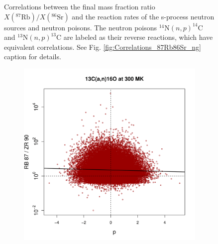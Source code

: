 \begin{figure}[!p]
\begin{subfigure}[b]{0.495\textwidth}
\end{subfigure}
\caption{\label{fig:Correlations_87Rb86Sr_n}Correlations between the final mass fraction ratio $X(^{87}\mathrm{Rb})/X(^{86}\mathrm{Sr})$ and the reaction rates of the s-process neutron sources and neutron poisons. The neutron poisons $^{14}\mathrm{N}(n,p)^{14}\mathrm{C}$ and $^{13}\mathrm{N}(n,p)^{13}\mathrm{C}$ are labeled as their reverse reactions, which have equivalent correlations. See Fig. \ref{fig:Correlations_87Rb86Sr_ng} caption for details.}
\end{figure}

\begin{figure}[!p]
\centering
\begin{subfigure}[b]{0.495\textwidth}
\centering
\includegraphics[width=\textwidth]{Chapter-3/figs/CorrRB87ZR90_13C_a_n_16O_300MK.png}  
\end{subfigure}
\hfill
\begin{subfigure}[b]{0.495\textwidth}  
\centering 

\end{subfigure}
\end{figure}
